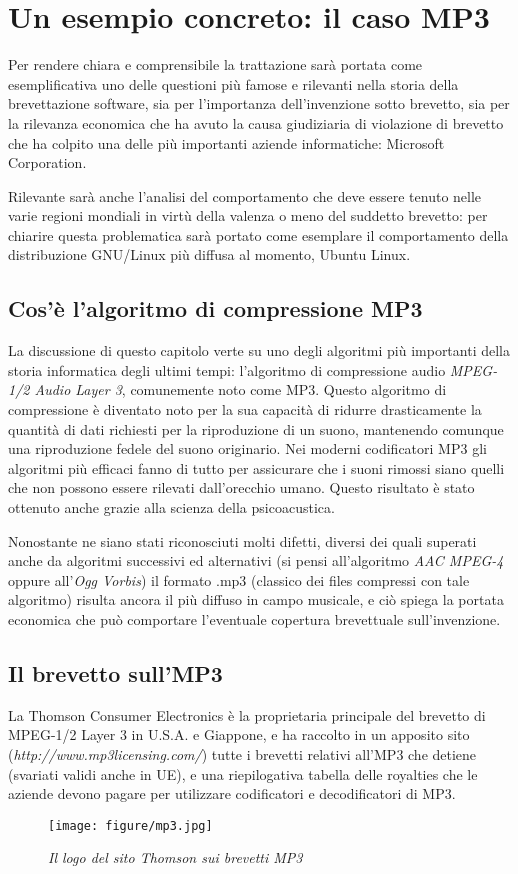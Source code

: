 \chapter{Un esempio concreto: il caso MP3}
Per rendere chiara e comprensibile la trattazione sarà portata come esemplificativa uno delle questioni più famose e rilevanti nella storia della brevettazione software, sia per l'importanza dell'invenzione sotto brevetto, sia per la rilevanza economica che ha avuto la causa giudiziaria di violazione di brevetto che ha colpito una delle più importanti aziende informatiche: Microsoft Corporation.

Rilevante sarà anche l'analisi del comportamento che deve essere tenuto nelle varie regioni mondiali in virtù della valenza o meno del suddetto brevetto: per chiarire questa problematica sarà portato come esemplare il comportamento della distribuzione GNU/Linux più diffusa al momento, Ubuntu Linux\cite{ubuntu}.

\section{Cos'è l'algoritmo di compressione MP3}
La discussione di questo capitolo verte su uno degli algoritmi più importanti della storia informatica degli ultimi tempi: l'algoritmo di compressione audio \textit{MPEG-1/2 Audio Layer 3}, comunemente noto come MP3. Questo algoritmo di compressione è diventato noto per la sua capacità di ridurre drasticamente la quantità di dati richiesti per la riproduzione di un suono, mantenendo comunque una riproduzione fedele del suono originario. Nei moderni codificatori MP3 gli algoritmi più efficaci fanno di tutto per assicurare che i suoni rimossi siano quelli che non possono essere rilevati dall'orecchio umano. Questo risultato è stato ottenuto anche grazie alla scienza della psicoacustica.

Nonostante ne siano stati riconosciuti molti difetti, diversi dei quali superati anche da algoritmi successivi ed alternativi (si pensi all'algoritmo \textit{AAC MPEG-4} oppure all'\textit{Ogg Vorbis}) il formato .mp3 (classico dei files compressi con tale algoritmo) risulta ancora il più diffuso in campo musicale, e ciò spiega la portata economica che può comportare l'eventuale copertura brevettuale sull'invenzione.
\section{Il brevetto sull'MP3}\label{mp3-patent}
La Thomson Consumer Electronics è la proprietaria principale del brevetto di MPEG-1/2 Layer 3 in U.S.A. e Giappone, e ha raccolto in un apposito sito (\textit{http://www.mp3licensing.com/}) tutte i brevetti relativi all'MP3 che detiene (svariati validi anche in UE), e una riepilogativa tabella delle royalties che le aziende devono pagare per utilizzare codificatori e decodificatori di MP3.
\begin{figure}[hb]
	\begin{center}
		\texttt{[image: figure/mp3.jpg]}
	\end{center}
	\caption{\textit{Il logo del sito Thomson sui brevetti MP3}}
\end{figure}
